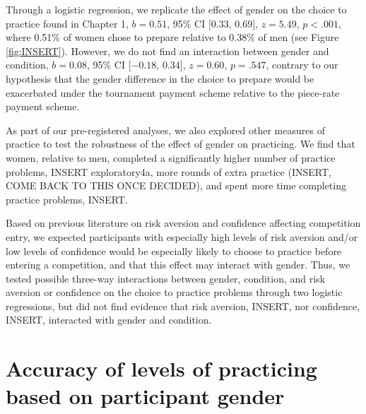 \documentclass[a4paper, nobind]{templates/ociamthesis}
\begin{document}
Through a logistic regression, we replicate the effect of gender on the choice to practice found in Chapter 1, \(b = 0.51\), 95\% CI \([0.33\), \(0.69]\), \(z = 5.49\), \(p < .001\), where 0.51\% of women chose to prepare relative to 0.38\% of men (see Figure \ref{fig:INSERT}). However, we do not find an interaction between gender and condition, \(b = 0.08\), 95\% CI \([-0.18\), \(0.34]\), \(z = 0.60\), \(p = .547\), contrary to our hypothesis that the gender difference in the choice to prepare would be exacerbated under the tournament payment scheme relative to the piece-rate payment scheme.

As part of our pre-registered analyses, we also explored other measures of practice to test the robustness of the effect of gender on practicing. We find that women, relative to men, completed a significantly higher number of practice problems, INSERT exploratory4a, more rounds of extra practice (INSERT, COME BACK TO THIS ONCE DECIDED), and spent more time completing practice problems, INSERT.

Based on previous literature on risk aversion and confidence affecting competition entry, we expected participants with especially high levels of risk aversion and/or low levels of confidence would be especially likely to choose to practice before entering a competition, and that this effect may interact with gender. Thus, we tested possible three-way interactions between gender, condition, and risk aversion or confidence on the choice to practice problems through two logistic regressions, but did not find evidence that risk aversion, INSERT, nor confidence, INSERT, interacted with gender and condition.

\hypertarget{accuracy-of-levels-of-practicing-based-on-participant-gender}{%
\section{Accuracy of levels of practicing based on participant gender}\label{accuracy-of-levels-of-practicing-based-on-participant-gender}}
\end{document}
